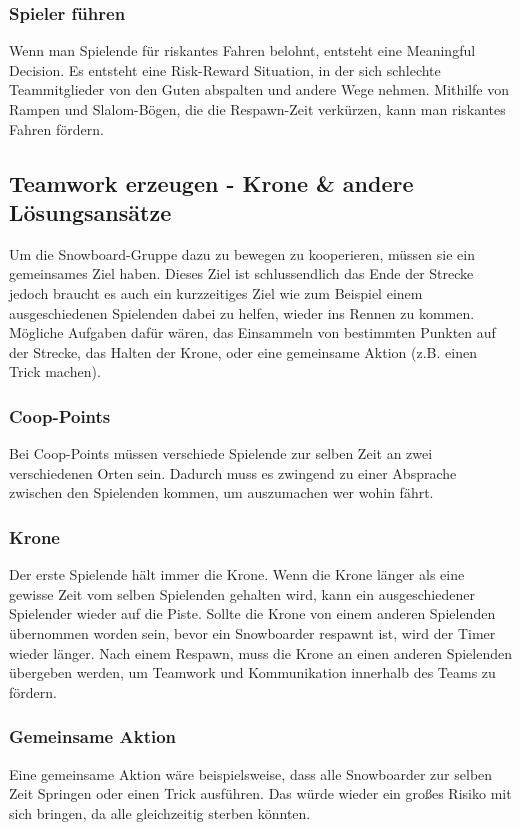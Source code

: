 \subsubsection{Spieler führen}
Wenn man Spielende für riskantes Fahren belohnt, entsteht eine Meaningful Decision. Es entsteht eine Risk-Reward Situation, in der sich schlechte Teammitglieder von den Guten abspalten und andere Wege nehmen. Mithilfe von Rampen und Slalom-Bögen, die die Respawn-Zeit verkürzen, kann man riskantes Fahren fördern.

\subsection{Teamwork erzeugen - Krone \& andere Lösungsansätze\label{_teamwork_erzeugen}}
Um die Snowboard-Gruppe dazu zu bewegen zu kooperieren, müssen sie ein gemeinsames Ziel haben. Dieses Ziel ist schlussendlich das Ende der Strecke jedoch braucht es auch ein kurzzeitiges Ziel wie zum Beispiel einem ausgeschiedenen Spielenden dabei zu helfen, wieder ins Rennen zu kommen. Mögliche Aufgaben dafür wären, das Einsammeln von bestimmten Punkten auf der Strecke, das Halten der Krone, oder eine gemeinsame Aktion (z.B. einen Trick machen).

\subsubsection{Coop-Points}
Bei Coop-Points müssen verschiede Spielende zur selben Zeit an zwei verschiedenen Orten sein. Dadurch muss es zwingend zu einer Absprache zwischen den Spielenden kommen, um auszumachen wer wohin fährt.

\subsubsection{Krone\label{_krone}}
Der erste Spielende hält immer die Krone. Wenn die Krone länger als eine gewisse Zeit vom selben Spielenden gehalten wird, kann ein ausgeschiedener Spielender wieder auf die Piste. Sollte die Krone von einem anderen Spielenden übernommen worden sein, bevor ein Snowboarder respawnt ist, wird der Timer wieder länger. Nach einem Respawn, muss die Krone an einen anderen Spielenden übergeben werden, um Teamwork und Kommunikation innerhalb des Teams zu fördern.

\subsubsection{Gemeinsame Aktion}
Eine gemeinsame Aktion wäre beispielsweise, dass alle Snowboarder zur selben Zeit Springen oder einen Trick ausführen. Das würde wieder ein großes Risiko mit sich bringen, da alle gleichzeitig sterben könnten.

